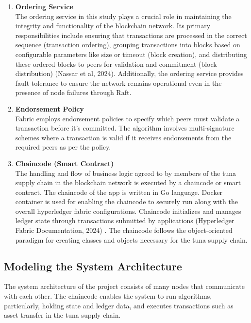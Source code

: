 \begin{enumerate}
		\item \textbf{Ordering Service} \\ The ordering service in this study plays a crucial role in maintaining the integrity and functionality of the blockchain network. Its primary responsibilities include ensuring that transactions are processed in the correct sequence (transaction ordering), grouping transactions into blocks based on configurable parameters like size or timeout (block creation), and distributing these ordered blocks to peers for validation and commitment (block distribution) (Nassar et al, 2024)\nocite{method-3}. Additionally, the ordering service provides fault tolerance to ensure the network remains operational even in the presence of node failures through Raft.
		
		\item \textbf{Endorsement Policy} \\Fabric employs endorsement policies to specify which peers must validate a transaction before it's committed. The algorithm involves multi-signature schemes where a transaction is valid if it receives endorsements from the required peers as per the policy.
		
		\item \textbf{Chaincode (Smart Contract)} \\The handling and flow of business logic agreed to by members of the tuna supply chain in the blockchain network is executed by a chaincode or smart contract. The chaincode of the app is written in Go language. Docker container is used for enabling the chaincode to securely run along with the overall hyperledger fabric configurations. Chaincode initializes and manages ledger state through transactions submitted by applications (Hyperledger Fabric Documentation, 2024) \nocite{method-4}. The chaincode follows the object-oriented paradigm for creating classes and objects necessary for the tuna supply chain.
		
		
	\end{enumerate}

\subsection{Modeling the System Architecture}
The system architecture of the project consists of many nodes that communicate with each other. The chaincode enables the system to run algorithms, particularly, holding state and ledger data, and executes transactions such as asset transfer in the tuna supply chain. 

